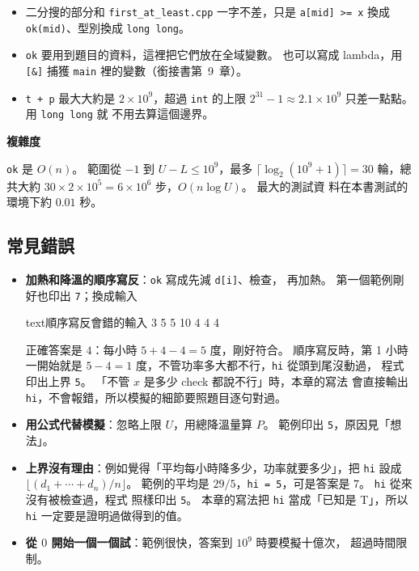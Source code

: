 
\begin{itemize}
\item 二分搜的部分和 \texttt{first\_at\_least.cpp} 一字不差，只是
\texttt{a[mid] >= x} 換成 \texttt{ok(mid)}、型別換成 \texttt{long long}。
\item \texttt{ok} 要用到題目的資料，這裡把它們放在全域變數。 也可以寫成
lambda，用 \texttt{[\&]} 捕獲 \texttt{main} 裡的變數（銜接書第~9~章）。
\item \texttt{t + p} 最大大約是 $2 \times 10^9$，超過 \texttt{int} 的上限
$2^{31} - 1 \approx 2.1 \times 10^9$ 只差一點點。 用 \texttt{long long} 就
不用去算這個邊界。
\end{itemize}

\textbf{複雜度}

\texttt{ok} 是 $O(n)$。 範圍從 $-1$ 到 $U - L \le 10^9$，最多
$\lceil \log_2 (10^9 + 1) \rceil = 30$ 輪，總共大約
$30 \times 2 \times 10^5 = 6 \times 10^6$ 步，$O(n \log U)$。 最大的測試資
料在本書測試的環境下約 $0.01$ 秒。

\subsection{常見錯誤}

\begin{itemize}
\item \textbf{加熱和降溫的順序寫反}：\texttt{ok} 寫成先減 \texttt{d[i]}、檢查，
再加熱。 第一個範例剛好也印出 \texttt{7}；換成輸入
\begin{code}{text}{順序寫反會錯的輸入}
3 5 5 10
4 4 4
\end{code}
正確答案是 $4$：每小時 $5 + 4 - 4 = 5$ 度，剛好符合。 順序寫反時，第 1 小時
一開始就是 $5 - 4 = 1$ 度，不管功率多大都不行，\texttt{hi} 從頭到尾沒動過，
程式印出上界 \texttt{5}。 「不管 $x$ 是多少 check 都說不行」時，本章的寫法
會直接輸出 \texttt{hi}，不會報錯，所以模擬的細節要照題目逐句對過。
\item \textbf{用公式代替模擬}：忽略上限 $U$，用總降溫量算 $P$。 範例印出
\texttt{5}，原因見「想法」。
\item \textbf{上界沒有理由}：例如覺得「平均每小時降多少，功率就要多少」，把
\texttt{hi} 設成 $\lfloor (d_1 + \cdots + d_n) / n \rfloor$。 範例的平均是
$29 / 5$，\texttt{hi = 5}，可是答案是 $7$。 \texttt{hi} 從來沒有被檢查過，程式
照樣印出 \texttt{5}。 本章的寫法把 \texttt{hi} 當成「已知是 T」，所以
\texttt{hi} 一定要是證明過做得到的值。
\item \textbf{從 $0$ 開始一個一個試}：範例很快，答案到 $10^9$ 時要模擬十億次，
超過時間限制。
\end{itemize}

